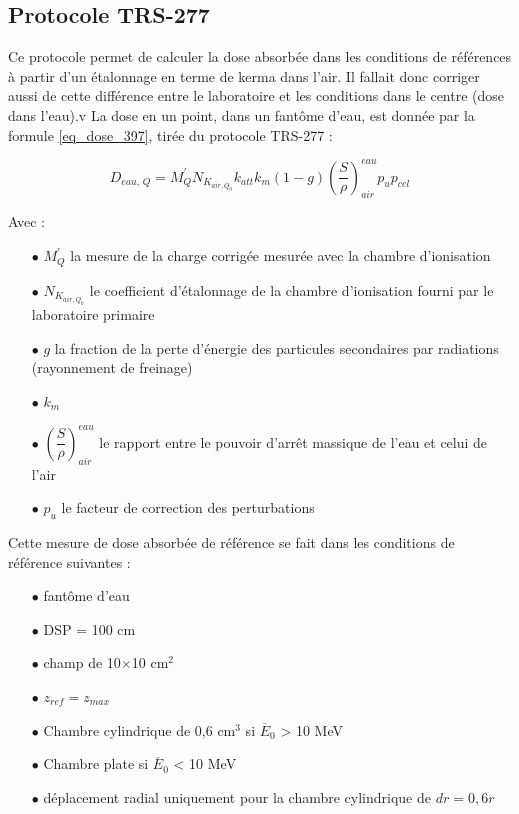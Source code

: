 \documentclass{article}
\begin{document}
\subsection{Protocole TRS-277}

Ce protocole permet de calculer la dose absorbée dans les conditions de références à partir d'un étalonnage en terme de kerma dans l'air. Il fallait donc corriger aussi de cette différence entre le laboratoire et les conditions dans le centre (dose dans l'eau).v La dose en un point, dans un fantôme d'eau, est donnée par la formule \ref*{eq_dose_397}, tirée du protocole TRS-277 :

\begin{equation}
  D_{eau,\, Q} = M_Q^{'} N_{K_{air, Q_0}} k_{att} k_m (1-g) \left( \dfrac{S}{\rho} \right)^{eau}_{air} p_u p_{cel}
  \label{eq_dose_397}
\end{equation}

Avec :

\begin{itemize}
  \item[$\bullet$] $M_Q^{'}$ la mesure de la charge corrigée mesurée avec la chambre d'ionisation 
  \item[$\bullet$] $N_{K_{air, Q_0}}$ le coefficient d'étalonnage de la chambre d'ionisation fourni par le laboratoire primaire
  \item[$\bullet$] $g$ la fraction de la perte d'énergie des particules secondaires par radiations (rayonnement de freinage)
  \item[$\bullet$] $k_m$ 
  \item[$\bullet$] $\left( \dfrac{S}{\rho} \right)^{eau}_{air}$ le rapport entre le pouvoir d'arrêt massique de l'eau et celui de l'air
  \item[$\bullet$] $p_u$ le facteur de correction des perturbations
\end{itemize}

Cette mesure de dose absorbée de référence se fait dans les conditions de référence suivantes :

\begin{itemize}
  \item[$\bullet$] fantôme d'eau
  \item[$\bullet$] DSP = 100 cm
  \item[$\bullet$] champ de 10$\times$10 cm$^2$
  \item[$\bullet$] $z_{ref} = z_{max}$
  \item[$\bullet$] Chambre cylindrique de 0,6 cm$^3$ si $\overline{E}_0$ > 10 MeV
  \item[$\bullet$] Chambre plate si $\overline{E}_0$ < 10 MeV
  \item[$\bullet$] déplacement radial uniquement pour la chambre cylindrique de $dr = 0,6r$
\end{itemize}
\end{document}
